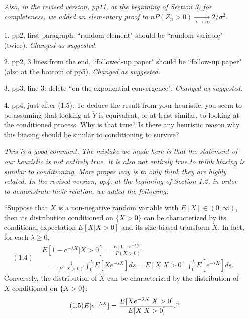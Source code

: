 \documentclass[12pt,a4paper]{amsart}
\numberwithin{equation}{section}
\begin{document}
\begin{itemize}
	{\it Also, in the revised version, pp11, at the beginning of Section 3, for completeness, we added an elementary proof to $n P(Z_n > 0) \xrightarrow[n\to \infty]{} 2/ \sigma^2$.}
\\	
\item[1.] 
	pp2, first paragraph: ``random element" should be ``random variable" (twice). 
	{\it Changed as suggested.}
\\	
\item[2.] 
	pp2, 3 lines from the end, ``followed-up paper" should be ``follow-up paper" (also at the bottom of pp5). 
	{\it Changed as suggested.}
\\
\item[3.] 
	pp3, line 3: delete ``on the exponential convergence". 
	{\it Changed as suggested.}
\\
\item[4.] 
	pp4, just after (1.5): To deduce the result from your heuristic, you seem to be assuming that looking at $\ddot Y$ is equivalent, or at least similar, to looking at the conditioned process.  
	Why is that true? 
	Is there any heuristic reason why this biasing should be similar to conditioning to survive? 
	
	{\it This is a good comment. 
	The mistake we made here is that the statement of our heuristic is not entirely true. 
	It is also not entirely true to think biasing is similar to conditioning. 
	More proper way is to only think they are highly related.
	In the revised version, pp4, at the beginning of Section 1.2, in order to demonstrate their relation, we added the following:

	``Suppose that $X$ is a non-negative 
	random variable with $E[X] \in (0,\infty)$,
	then its distribution conditioned on $\{ X > 0\}$ can be characterized by its conditional expectation $E[X|X>0]$ and its size-biased transform $\dot X$.
	In fact, for each $\lambda \geq 0$,
	\begin{equation*}
	(1.4)
	\begin{split}
	&E[1-e^{-\lambda X}|X>0]
	= \frac{E[1-e^{-\lambda X}]}{P(X>0)}
	\\&\quad = \frac{1}{P(X>0)}\int_0^\lambda E[Xe^{-s X}]ds = E[X|X>0]\int_0^\lambda E[e^{-s \dot X}]ds.
	\end{split}
	\end{equation*}
	Conversely, the distribution of $\dot X$ can be characterized 
	by the distribution of $X$ conditioned on $\{ X > 0\}$: 
	\begin{equation*}
	(1.5)
	\begin{split}
	E[e^{- \lambda \dot X}] 
	= \frac{E[Xe^{-\lambda X}| X>0]}{E[X| X>0]}."
	\end{split}
	\end{equation*}
	
}
\end{itemize}
\end{document}
